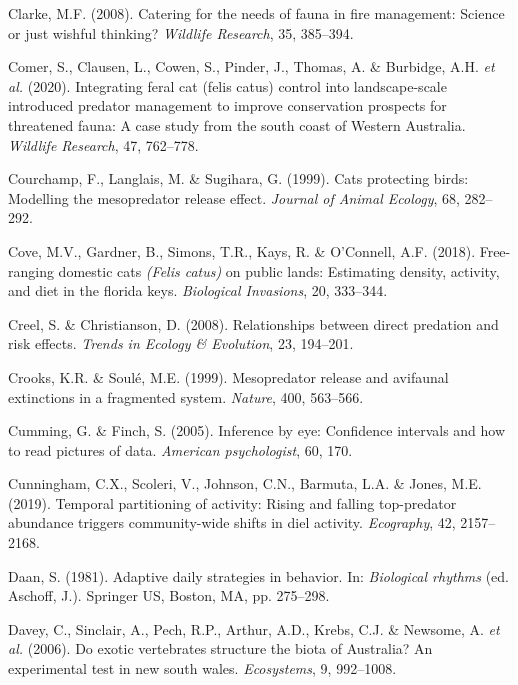 \documentclass[11pt,a4paper,titlepage,twoside,openright]{style/unimelbthesis}
\begin{document}
\begin{mainmatter}
\leavevmode\hypertarget{ref-clarke2008catering}{}%
Clarke, M.F. (2008). Catering for the needs of fauna in fire management: Science or just wishful thinking? \emph{Wildlife Research}, 35, 385--394.

\leavevmode\hypertarget{ref-comer2020integrating}{}%
Comer, S., Clausen, L., Cowen, S., Pinder, J., Thomas, A. \& Burbidge, A.H. \emph{et al.} (2020). Integrating feral cat (felis catus) control into landscape-scale introduced predator management to improve conservation prospects for threatened fauna: A case study from the south coast of Western Australia. \emph{Wildlife Research}, 47, 762--778.

\leavevmode\hypertarget{ref-courchamp1999cats}{}%
Courchamp, F., Langlais, M. \& Sugihara, G. (1999). Cats protecting birds: Modelling the mesopredator release effect. \emph{Journal of Animal Ecology}, 68, 282--292.

\leavevmode\hypertarget{ref-cove2018free}{}%
Cove, M.V., Gardner, B., Simons, T.R., Kays, R. \& O'Connell, A.F. (2018). Free-ranging domestic cats \emph{(Felis catus)} on public lands: Estimating density, activity, and diet in the florida keys. \emph{Biological Invasions}, 20, 333--344.

\leavevmode\hypertarget{ref-creel2008relationships}{}%
Creel, S. \& Christianson, D. (2008). Relationships between direct predation and risk effects. \emph{Trends in Ecology \& Evolution}, 23, 194--201.

\leavevmode\hypertarget{ref-crooks1999mesopredator}{}%
Crooks, K.R. \& Soulé, M.E. (1999). Mesopredator release and avifaunal extinctions in a fragmented system. \emph{Nature}, 400, 563--566.

\leavevmode\hypertarget{ref-cumming2005inference}{}%
Cumming, G. \& Finch, S. (2005). Inference by eye: Confidence intervals and how to read pictures of data. \emph{American psychologist}, 60, 170.

\leavevmode\hypertarget{ref-cunningham2019temporal}{}%
Cunningham, C.X., Scoleri, V., Johnson, C.N., Barmuta, L.A. \& Jones, M.E. (2019). Temporal partitioning of activity: Rising and falling top-predator abundance triggers community-wide shifts in diel activity. \emph{Ecography}, 42, 2157--2168.

\leavevmode\hypertarget{ref-daan1981adaptive}{}%
Daan, S. (1981). Adaptive daily strategies in behavior. In: \emph{Biological rhythms} (ed. Aschoff, J.). Springer US, Boston, MA, pp. 275--298.

\leavevmode\hypertarget{ref-davey2006exotic}{}%
Davey, C., Sinclair, A., Pech, R.P., Arthur, A.D., Krebs, C.J. \& Newsome, A. \emph{et al.} (2006). Do exotic vertebrates structure the biota of Australia? An experimental test in new south wales. \emph{Ecosystems}, 9, 992--1008.


\end{mainmatter}
\end{document}
